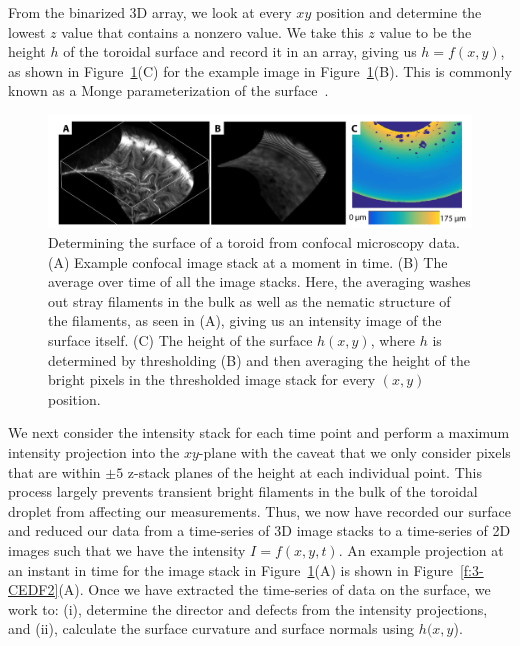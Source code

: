 From the binarized 3D array, we look at every $xy$ position and determine the lowest $z$ value that contains a nonzero value.
We take this $z$ value to be the height $h$ of the toroidal surface and record it in an array, giving us $h = f(x,y)$, as shown in Figure~\ref{f:3-SurfaceHeight}(C) for the example image in Figure~\ref{f:3-SurfaceHeight}(B).
This is commonly known as a Monge parameterization of the surface~\cite{RN23}.
\begin{figure}
  \centering
  \includegraphics{figures/C3/Ch3-Figs_SurfaceHeight.png}
  \caption{Determining the surface of a toroid from confocal microscopy data.
  (A) Example confocal image stack at a moment in time.
  (B) The average over time of all the image stacks.
  Here, the averaging washes out stray filaments in the bulk as well as the nematic structure of the filaments, as seen in (A), giving us an intensity image of the surface itself.
  (C) The height of the surface $h(x,y)$, where $h$ is determined by thresholding (B) and then averaging the height of the bright pixels in the thresholded image stack for every $(x,y)$ position.}\label{f:3-SurfaceHeight}
\end{figure}

We next consider the intensity stack for each time point and perform a maximum intensity projection into the $xy$-plane with the caveat that we only consider pixels that are within $\pm 5$ z-stack planes of the height at each individual point.
This process largely prevents transient bright filaments in the bulk of the toroidal droplet from affecting our measurements.
Thus, we now have recorded our surface and reduced our data from a time-series of 3D image stacks to a time-series of 2D images such that we have the intensity $I = f(x,y,t)$.
An example projection at an instant in time for the image stack in Figure~\ref{f:3-SurfaceHeight}(A) is shown in Figure~\ref{f:3-CEDF2}(A).
Once we have extracted the time-series of data on the surface, we work to: (i), determine the director and defects from the intensity projections, and (ii), calculate the surface curvature and surface normals using $h(x,y$).





